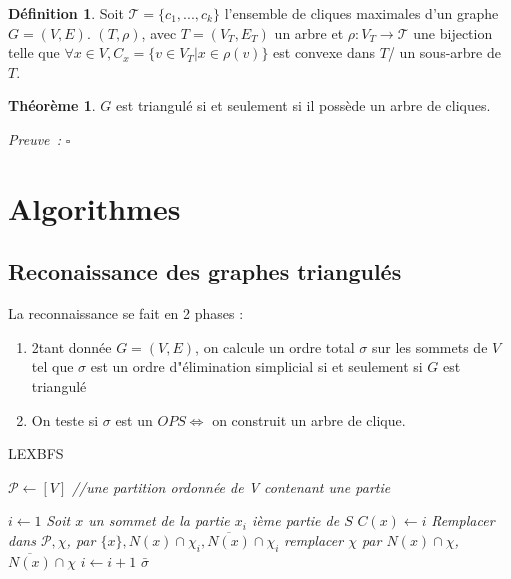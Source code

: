 \documentclass{book}
\theoremstyle{definition}
\newtheorem{theorem}{Théorème}
\newtheorem{definition}{Définition}
\numberwithin{lemma}{subsection}
\numberwithin{theorem}{subsection}
\numberwithin{definition}{subsection}
\numberwithin{proposition}{subsection}
\numberwithin{corollary}{subsection}
\numberwithin{property}{subsection}
\numberwithin{example}{subsection}
\numberwithin{heuristique}{subsection}
\numberwithin{scenario}{subsection}
\newenvironment{proofi} {\noindent\emph{Preuve~:}} {\hfill $\square$\vspace{0.2cm}}
\begin{document}
\begin{definition}
Soit $\mathcal{T} = \{ c_1, ..., c_k \}$ l'ensemble de cliques maximales d'un graphe $G = (V, E)$. $(T, \rho)$, avec $T = (V_T, E_T)$ un arbre et $\rho : V_T \to \mathcal{T}$ une bijection telle que $\forall x \in V, C_x = \{v \in V_T | x \in \rho(v)  \}$ est convexe dans $T$/ un sous-arbre de $T$.
\end{definition}

\begin{theorem}
 $G$ est triangulé si et seulement si il possède un arbre de cliques.
\end{theorem}

\begin{proofi}
\end{proofi}

\section{Algorithmes}

\subsection{Reconaissance des graphes triangulés}

La reconnaissance se fait en 2 phases :
\begin{enumerate}
    \item 2tant donnée $G = (V, E)$, on calcule un ordre total $\sigma$ sur les sommets de $V$ tel que $\sigma$ est un ordre d"élimination simplicial si et seulement si $G$ est triangulé
    \item On teste si $\sigma$ est un $OPS \iff$ on construit un arbre de clique. 
\end{enumerate}

\begin{algorithm}[H]\label{algo:LEXBFS}
\caption{LEXBFS} 
\SetAlgoLined
\DontPrintSemicolon
\SetAlgoLined
\DontPrintSemicolon
{}
    
    $\mathcal{P} \gets [V]$\; \textit{//une partition ordonnée de V contenant une partie}
    
    $i \gets 1$\;
    {
        \textit{Soit $x$ un sommet de la partie $x_i$ ième partie de $S$}\;
        $C(x) \gets i$\;
        \textit{Remplacer dans $\mathcal{P}, \chi$, par $\{ x \}, N(x) \cap \chi_i, \overline{N(x)} \cap \chi_i$}\;
        {
            {
                \textit{remplacer $\chi$ par $N(x) \cap \chi$, $\overline{N(x)} \cap \chi$}\;
            }
            $i \gets i + 1$\;
        }
    }
    \Return $\bar{\sigma}$
\end{algorithm}
\end{document}
